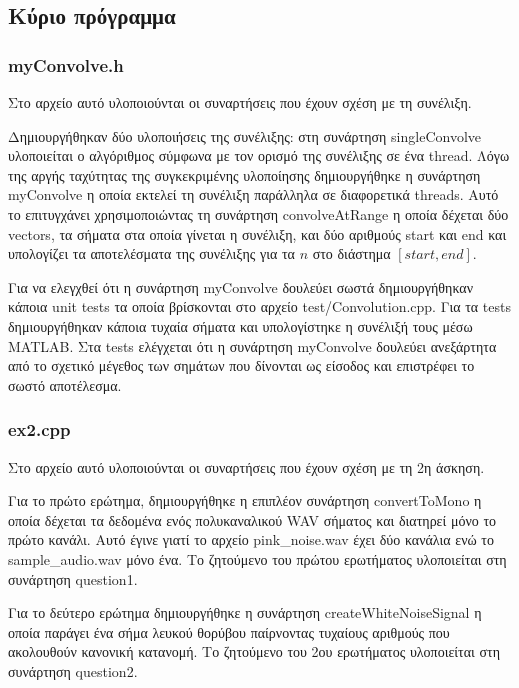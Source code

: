 \documentclass[12pt,a4paper]{article}
\begin{document}
    \subsection{Κύριο πρόγραμμα}
    \subsubsection{myConvolve.h}
    Στο αρχείο αυτό υλοποιούνται οι συναρτήσεις που έχουν σχέση με τη συνέλιξη. \par
    Δημιουργήθηκαν δύο υλοποιήσεις της συνέλιξης: στη συνάρτηση singleConvolve υλοποιείται ο αλγόριθμος σύμφωνα με τον ορισμό 
    της συνέλιξης σε ένα thread. Λόγω της αργής ταχύτητας της συγκεκριμένης υλοποίησης δημιουργήθηκε η συνάρτηση myConvolve η 
    οποία εκτελεί τη συνέλιξη παράλληλα σε διαφορετικά threads. Αυτό το επιτυγχάνει χρησιμοποιώντας τη συνάρτηση convolveAtRange 
    η οποία δέχεται δύο vectors, τα σήματα στα οποία γίνεται η συνέλιξη, και δύο αριθμούς start και end και υπολογίζει τα αποτελέσματα 
    της συνέλιξης για τα $n$ στο διάστημα $[start,end]$. \par
    Για να ελεγχθεί ότι η συνάρτηση myConvolve δουλεύει σωστά δημιουργήθηκαν κάποια unit tests τα οποία βρίσκονται στο αρχείο test/Convolution.cpp.
    Για τα tests δημιουργήθηκαν κάποια τυχαία σήματα και υπολογίστηκε η συνέλιξή τους μέσω MATLAB. Στα tests ελέγχεται ότι η συνάρτηση 
    myConvolve δουλεύει ανεξάρτητα από το σχετικό μέγεθος των σημάτων που δίνονται ως είσοδος και επιστρέφει το σωστό αποτέλεσμα.
    \subsubsection{ex2.cpp}
    Στο αρχείο αυτό υλοποιούνται οι συναρτήσεις που έχουν σχέση με τη 2η άσκηση. \par
    Για το πρώτο ερώτημα, δημιουργήθηκε η επιπλέον συνάρτηση convertToMono η οποία δέχεται τα δεδομένα ενός πολυκαναλικού WAV σήματος και 
    διατηρεί μόνο το πρώτο κανάλι. Αυτό έγινε γιατί το αρχείο pink\_noise.wav έχει δύο κανάλια ενώ το sample\_audio.wav μόνο ένα. Το ζητούμενο του 
    πρώτου ερωτήματος υλοποιείται στη συνάρτηση question1.\par
    Για το δεύτερο ερώτημα δημιουργήθηκε η συνάρτηση createWhiteNoiseSignal η οποία παράγει ένα σήμα λευκού θορύβου παίρνοντας τυχαίους 
    αριθμούς που ακολουθούν κανονική κατανομή. Το ζητούμενο του 2ου ερωτήματος υλοποιείται στη συνάρτηση question2.
\end{document}
